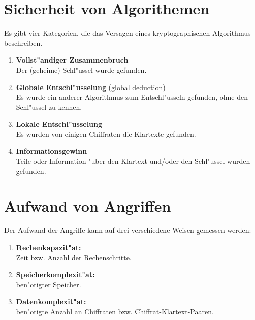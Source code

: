 \section*{Sicherheit von Algorithemen}

Es gibt vier Kategorien, die das Versagen eines kryptographischen Algorithmus beschreiben.
\begin{enumerate}
\item{\bf Vollst"andiger Zusammenbruch} \\ 
  Der (geheime) Schl"ussel wurde gefunden.
\item{\bf Globale Entschl"usselung} (global deduction) \\
 Es wurde ein anderer Algorithmus zum Entschl"usseln gefunden, ohne den Schl"ussel zu kennen.
\item{\bf Lokale Entschl"usselung} \\
  Es wurden von einigen Chiffraten die Klartexte gefunden.
\item{\bf Informationsgewinn} \\
  Teile oder Information "uber den Klartext und/oder den Schl"ussel wurden gefunden.
\end{enumerate}


\section*{Aufwand von Angriffen}

Der Aufwand der Angriffe kann auf drei verschiedene Weisen gemessen werden:
\begin{enumerate}
  \item{\bf Rechenkapazit"at:} \\
    Zeit bzw. Anzahl der Rechenschritte.
  \item{\bf Speicherkomplexit"at:} \\
    ben"otigter Speicher.
  \item{\bf Datenkomplexit"at:} \\
    ben"otigte Anzahl an Chiffraten bzw. Chiffrat-Klartext-Paaren.
\end{enumerate}    
  
  
